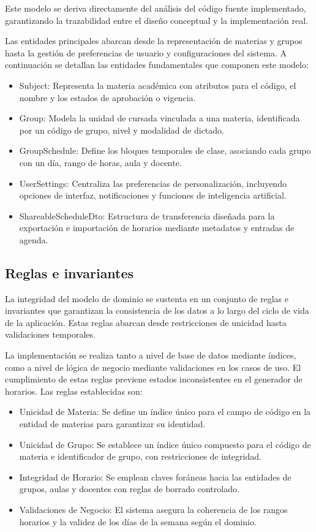 Este modelo se deriva directamente del análisis del código fuente implementado, garantizando la trazabilidad entre el diseño conceptual y la implementación real.

Las entidades principales abarcan desde la representación de materias y grupos hasta la gestión de preferencias de usuario y configuraciones del sistema. A continuación se detallan las entidades fundamentales que componen este modelo:

\begin{itemize}
  \item Subject: Representa la materia académica con atributos para el código, el nombre y los estados de aprobación o vigencia.
  \item Group: Modela la unidad de cursada vinculada a una materia, identificada por un código de grupo, nivel y modalidad de dictado.
  \item GroupSchedule: Define los bloques temporales de clase, asociando cada grupo con un día, rango de horas, aula y docente.
  \item UserSettings: Centraliza las preferencias de personalización, incluyendo opciones de interfaz, notificaciones y funciones de inteligencia artificial.
  \item ShareableScheduleDto: Estructura de transferencia diseñada para la exportación e importación de horarios mediante metadatos y entradas de agenda.
\end{itemize}

\subsection{Reglas e invariantes}
La integridad del modelo de dominio se sustenta en un conjunto de reglas e invariantes que garantizan la consistencia de los datos a lo largo del ciclo de vida de la aplicación. Estas reglas abarcan desde restricciones de unicidad hasta validaciones temporales.

La implementación se realiza tanto a nivel de base de datos mediante índices, como a nivel de lógica de negocio mediante validaciones en los casos de uso. El cumplimiento de estas reglas previene estados inconsistentes en el generador de horarios. Las reglas establecidas son:

\begin{itemize}
  \item Unicidad de Materia: Se define un índice único para el campo de código en la entidad de materias para garantizar su identidad.
  \item Unicidad de Grupo: Se establece un índice único compuesto para el código de materia e identificador de grupo, con restricciones de integridad.
  \item Integridad de Horario: Se emplean claves foráneas hacia las entidades de grupos, aulas y docentes con reglas de borrado controlado.
  \item Validaciones de Negocio: El sistema asegura la coherencia de los rangos horarios y la validez de los días de la semana según el dominio.
\end{itemize}

